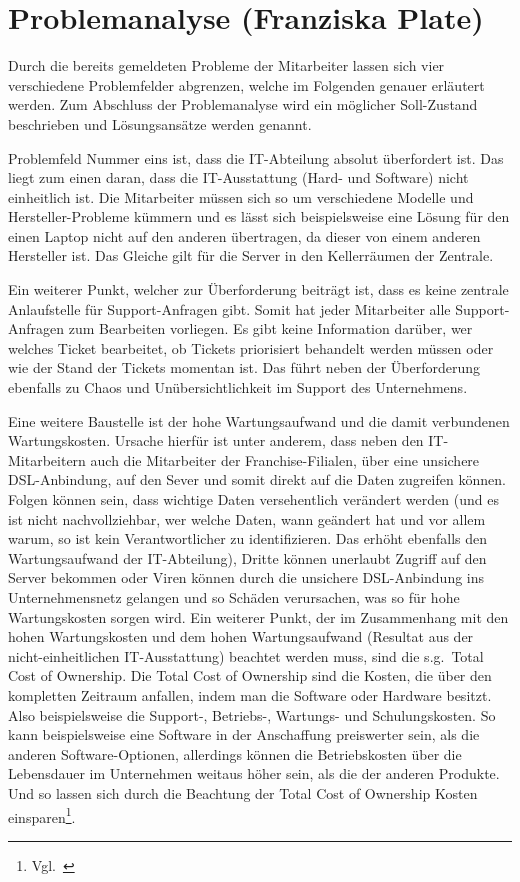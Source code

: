 \section{Problemanalyse (Franziska Plate)}

Durch die bereits gemeldeten Probleme der Mitarbeiter lassen sich vier
verschiedene Problemfelder abgrenzen, welche im Folgenden genauer
erläutert werden. Zum Abschluss der Problemanalyse wird ein möglicher
Soll-Zustand beschrieben und Lösungsansätze werden genannt.

Problemfeld Nummer eins ist, dass die IT-Abteilung absolut überfordert
ist. Das liegt zum einen daran, dass die IT-Ausstattung (Hard- und
Software) nicht einheitlich ist. Die Mitarbeiter müssen sich so um
verschiedene Modelle und Hersteller-Probleme kümmern und es lässt sich
beispielsweise eine Lösung für den einen Laptop nicht auf den anderen
übertragen, da dieser von einem anderen Hersteller ist. Das Gleiche
gilt für die Server in den Kellerräumen der Zentrale.

Ein weiterer Punkt, welcher zur Überforderung beiträgt ist, dass es
keine zentrale Anlaufstelle für Support-Anfragen gibt. Somit hat jeder
Mitarbeiter alle Support-Anfragen zum Bearbeiten vorliegen. Es gibt
keine Information darüber, wer welches Ticket bearbeitet, ob Tickets
priorisiert behandelt werden müssen oder wie der Stand der Tickets
momentan ist. Das führt neben der Überforderung ebenfalls zu Chaos und
Unübersichtlichkeit im Support des Unternehmens.

Eine weitere Baustelle ist der hohe Wartungsaufwand und die damit
verbundenen Wartungskosten. Ursache hierfür ist unter anderem, dass
neben den IT-Mitarbeitern auch die Mitarbeiter der Franchise-Filialen,
über eine unsichere DSL-Anbindung, auf den Sever und somit direkt auf
die Daten zugreifen können. Folgen können sein, dass wichtige Daten
versehentlich verändert werden (und es ist nicht nachvollziehbar, wer
welche Daten, wann geändert hat und vor allem warum, so ist kein
Verantwortlicher zu identifizieren. Das erhöht ebenfalls den
Wartungsaufwand der IT-Abteilung), Dritte können unerlaubt Zugriff auf
den Server bekommen oder Viren können durch die unsichere
DSL-Anbindung ins Unternehmensnetz gelangen und so Schäden
verursachen, was so für hohe Wartungskosten sorgen wird. Ein weiterer
Punkt, der im Zusammenhang mit den hohen Wartungskosten und dem hohen
Wartungsaufwand (Resultat aus der nicht-einheitlichen IT-Ausstattung)
beachtet werden muss, sind die s.g.~Total Cost of Ownership. Die Total
Cost of Ownership sind die Kosten, die über den kompletten Zeitraum
anfallen, indem man die Software oder Hardware besitzt. Also
beispielsweise die Support-, Betriebs-, Wartungs- und
Schulungskosten. So kann beispielsweise eine Software in der
Anschaffung preiswerter sein, als die anderen Software-Optionen,
allerdings können die Betriebskosten über die Lebensdauer im
Unternehmen weitaus höher sein, als die der anderen Produkte. Und so
lassen sich durch die Beachtung der Total Cost of Ownership Kosten
einsparen\footnote{Vgl.~\cite{TCO}}.

